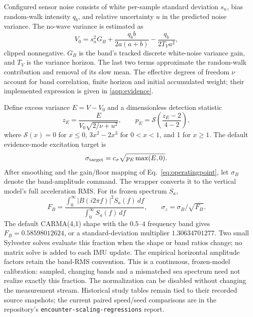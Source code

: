 \documentclass[conference]{IEEEtran}
\begin{document}
Configured sensor noise consists of white per-sample standard deviation
$s_n$, bias random-walk intensity $q_b$, and relative uncertainty $u$ in
the predicted noise variance. The no-wave variance is estimated as
\begin{equation}
 V_0=s_n^2G_B+
 \frac{q_b b}{2a(a+b)}-\frac{q_b}{2T_Va^2},
 \label{eq:V0}
\end{equation}
clipped nonnegative. $G_B$ is the band's tracked discrete white-noise
variance gain, and $T_V$ is the variance horizon. The last two terms
approximate the random-walk contribution and removal of its slow mean.
The effective degrees of freedom $\nu$ account for band correlation,
finite horizon and initial accumulated weight; their implemented expression
is given in \cref{app:evidence}.

Define excess variance $E=V-V_0$ and a dimensionless detection statistic
\begin{equation}
 z_E=\frac{E}{V_0\sqrt{2/\nu+u^2}},\qquad
 p_E=\mathcal S\!\left(\frac{z_E-2}{4-2}\right),
 \label{eq:evidence}
\end{equation}
where $\mathcal S(x)=0$ for $x\le0$, $3x^2-2x^3$ for $0<x<1$, and
1 for $x\ge1$. The default evidence-mode excitation target is
\begin{equation}
 \sigma_{\rm target}=c_\sigma\sqrt{p_E\max(E,0)}.
 \label{eq:sigmatarget}
\end{equation}
After smoothing and the gain/floor mapping of Eq.~\eqref{eq:operatingpoint},
let $\sigma_B$ denote the band-amplitude command. The wrapper converts it
to the vertical model's full acceleration RMS. For its frozen spectrum $S_a$,
\begin{equation}
 F_B=\frac{\int_0^\infty |B(i2\pi f)|^2 S_a(f)\,df}
               {\int_0^\infty S_a(f)\,df},\qquad
 \sigma_z=\sigma_B/\sqrt{F_B}.
 \label{eq:bandnormalization}
\end{equation}
The default CARMA(4,1) shape with the $0.5$--$4$ frequency band gives
$F_B=0.58598012624$, or a standard-deviation multiplier $1.30634701277$.
Two small Sylvester solves evaluate this fraction when the shape or band
ratios change; no matrix solve is added to each IMU update. The empirical
horizontal amplitude factors retain the band-RMS convention. This is a
continuous, frozen-model calibration: sampled, changing bands and a
mismatched sea spectrum need not realize exactly this fraction. The
normalization can be disabled without changing the measurement stream.
Historical study tables remain tied to their recorded source snapshots;
the current paired speed/seed comparisons are in the repository's
\texttt{encounter-scaling-regressions} report.
\end{document}
